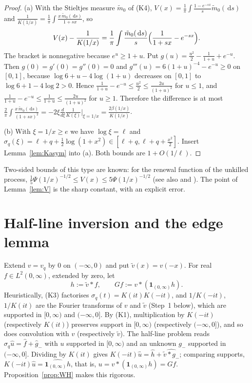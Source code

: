 \documentclass[11pt]{amsart}
\newcommand{\one}{\mathbf{1}}
\newcommand{\dd}{\,\mathrm{d}}
\theoremstyle{definition}
\theoremstyle{remark}
\numberwithin{equation}{section}
\begin{document}
\begin{proof}
(a) With the Stieltjes measure $\tilde m_0$ of (K4), $V(x)=\frac1\pi\int\frac{1-e^{-sx}}s\tilde m_0(\dd s)$ and $\frac1{K(1/x)}=\frac1\pi\int\frac{x\,\tilde m_0(\dd s)}{1+sx}$, so
\[
V(x)-\frac1{K(1/x)}=\frac1\pi\int\frac{\tilde m_0(\dd s)}{s}\Bigl(\frac1{1+sx}-e^{-sx}\Bigr).
\]
The bracket is nonnegative because $e^u\ge1+u$. Put $g(u)=\frac{u^2}2-\frac1{1+u}+e^{-u}$. Then $g(0)=g'(0)=g''(0)=0$ and $g'''(u)=6(1+u)^{-4}-e^{-u}\ge0$ on $[0,1]$, because $\log6+u-4\log(1+u)$ decreases on $[0,1]$ to $\log6+1-4\log2>0$. Hence $\frac1{1+u}-e^{-u}\le\frac{u^2}2\le\frac{2u}{(1+u)^2}$ for $u\le1$, and $\frac1{1+u}-e^{-u}\le\frac1{1+u}\le\frac{2u}{(1+u)^2}$ for $u\ge1$. Therefore the difference is at most $\frac2\pi\int\frac{x\,\tilde m_0(\dd s)}{(1+sx)^2}=-2\xi\frac{d}{d\xi}\frac1{K(\xi)}\big|_{\xi=1/x}=\frac{2\beta(1/x)}{K(1/x)}$.

(b) With $\xi=1/x\ge e$ we have $\log\xi=\ell$ and $\sigma_q(\xi)=\ell+q+\frac12\log(1+x^2)\in[\ell+q,\ell+q+\frac{x^2}2]$. Insert Lemma~\ref{lem:Kasym} into (a). Both bounds are $1+O(1/\ell)$.
\end{proof}

Two-sided bounds of this type are known: for the renewal function of the unkilled process, $\frac15\Psi(1/x)^{-1/2}\le V(x)\le5\Psi(1/x)^{-1/2}$ \cite[Thm.~4.4]{KMR13} (see also \cite[Lemma~4.1]{GR12} and \cite[Rem.~3.6]{Kw11}). The point of Lemma~\ref{lem:V} is the sharp constant, with an explicit error.

\section{Half-line inversion and the edge lemma}\label{sec:halfline}

Extend $v=v_q$ by $0$ on $(-\infty,0)$ and put $\tilde v(x)=v(-x)$. For real $f\in L^2(0,\infty)$, extended by zero, let
\[
h:=\tilde v*f,\qquad Gf:=v*(\one_{(0,\infty)}h).
\]
Heuristically, (K3) factorises $\sigma_q(t)=K(it)K(-it)$, and $1/K(-it)$, $1/K(it)$ are the Fourier transforms of $v$ and $\tilde v$ (Step~1 below), which are supported in $[0,\infty)$ and $(-\infty,0]$. By (K1), multiplication by $K(-it)$ (respectively $K(it)$) preserves support in $[0,\infty)$ (respectively $(-\infty,0]$), and so does convolution with $v$ (respectively $\tilde v$). The half-line problem reads $\sigma_q\hat u=\hat f+\hat g_-$ with $u$ supported in $[0,\infty)$ and an unknown $g_-$ supported in $(-\infty,0]$. Dividing by $K(it)$ gives $K(-it)\hat u=\hat h+\widehat{\tilde v*g_-}$; comparing supports, $K(-it)\hat u=\widehat{\one_{(0,\infty)}h}$, that is, $u=v*(\one_{(0,\infty)}h)=Gf$. Proposition~\ref{prop:WH} makes this rigorous.
\end{document}
